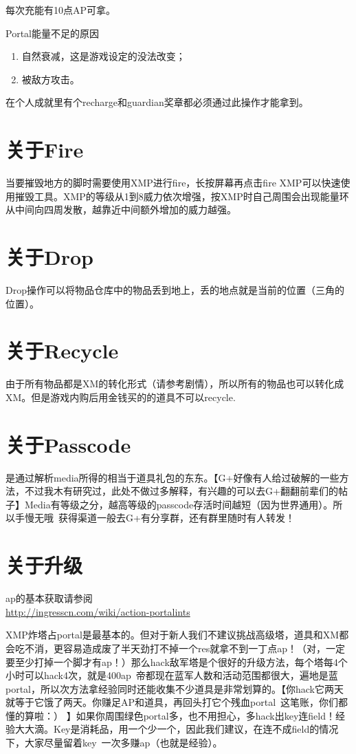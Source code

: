 \documentclass[a4paper]{article}
\begin{document}
每次充能有10点AP可拿。\par
Portal能量不足的原因
\begin{enumerate}
\item 自然衰减，这是游戏设定的没法改变；
\item 被敌方攻击。
\end{enumerate}
在个人成就里有个recharge和guardian奖章都必须通过此操作才能拿到。

\section{关于Fire}
当要摧毁地方的脚时需要使用XMP进行fire，长按屏幕再点击fire XMP可以快速使用摧毁工具。XMP的等级从1到8威力依次增强，按XMP时自己周围会出现能量环从中间向四周发散，越靠近中间额外增加的威力越强。

\section{关于Drop}
Drop操作可以将物品仓库中的物品丢到地上，丢的地点就是当前的位置（三角的位置）。

\section{关于Recycle}
由于所有物品都是XM的转化形式（请参考剧情），所以所有的物品也可以转化成XM。但是游戏内购后用金钱买的的道具不可以recycle.

\section{关于Passcode}
是通过解析media所得的相当于道具礼包的东东。【G+好像有人给过破解的一些方法，不过我木有研究过，此处不做过多解释，有兴趣的可以去G+翻翻前辈们的帖子】Media有等级之分，越高等级的passcode存活时间越短（因为世界通用）。所以手慢无哦~获得渠道一般去G+有分享群，还有群里随时有人转发！

\section{关于升级}
ap的基本获取请参阅\\
\url{http://ingresscn.com/wiki/action-portalints}\par
XMP炸塔占portal是最基本的。但对于新人我们不建议挑战高级塔，道具和XM都会吃不消，更容易造成废了半天劲打不掉一个res就拿不到一丁点ap！（对，一定要至少打掉一个脚才有ap！）那么hack敌军塔是个很好的升级方法，每个塔每4个小时可以hack4次，就是400ap~帝都现在蓝军人数和活动范围都很大，遍地是蓝portal，所以次方法拿经验同时还能收集不少道具是非常划算的。【你hack它两天就等于它饿了两天。你赚足AP和道具，再回头打它个残血portal~这笔账，你们都懂的算啦：） 】如果你周围绿色portal多，也不用担心，多hack出key连field！经验大大滴。Key是消耗品，用一个少一个，因此我们建议，在连不成field的情况下，大家尽量留着key~一次多赚ap（也就是经验）。
\end{document}
